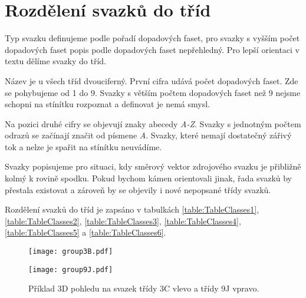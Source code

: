 \section{Rozdělení svazků do tříd}
Typ svazku definujeme podle pořadí dopadových faset, pro svazky s vyšším počet dopadových faset popis podle dopadových faset nepřehledný. Pro lepší orientaci v textu  dělíme svazky do tříd. 

Název je u všech tříd dvouciferný. První cifra udává počet dopadových faset. Zde se pohybujeme od 1 do 9. Svazky s větším počtem dopadových faset než 9 nejsme schopni na stínítku rozpoznat a definovat je nemá smysl. 
  
 Na pozici druhé cifry se objevují znaky abecedy \textit{A-Z}. Svazky s jednotným počtem odrazů se začínají značit od písmene \textit{A}. Svazky, které nemají dostatečný zářivý tok a nelze je spařit na stínítku neuvádíme. 
  
  Svazky popisujeme pro situaci, kdy směrový vektor zdrojového svazku je přibližně kolmý k rovině spodku. Pokud bychom kámen orientovali jinak, řada svazků by přestala existovat a zároveň by se objevily i nové nepopsané třídy svazků. 
  
  Rozdělení svazků do tříd je zapsáno v tabulkách \ref{table:TableClasses1}, \ref{table:TableClasses2}, \ref{table:TableClasses3}, \ref{table:TableClasses4}, \ref{table:TableClasses5} a \ref{table:TableClasses6}.
 
 \begin{figure}[ht]
\centering
\begin{minipage}[c]{0.325\textwidth}
\texttt{[image: group3B.pdf]}
\end{minipage}
\begin{minipage}[c]{0.325\textwidth}
\texttt{[image: group9J.pdf]}
\end{minipage}
\caption[Svazky třídy 3C a 9J.]{Příklad 3D pohledu na svazek třídy 3C vlevo a třídy 9J vpravo.}
\label{fig:modelClass3D1}
\end{figure}
 
